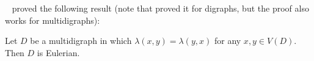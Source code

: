 
\Lov~\cite{L73} proved the following result (note that \Lov proved it for digraphs, but the proof also works for multidigraphs):
\begin{theorem}\label{thm:lovasz_lambda-reg}
Let $D$ be a multidigraph in which $\lambda(x,y) = \lambda(y,x)$ for any $x, y \in V(D)$. Then $D$ is Eulerian.
\end{theorem}









